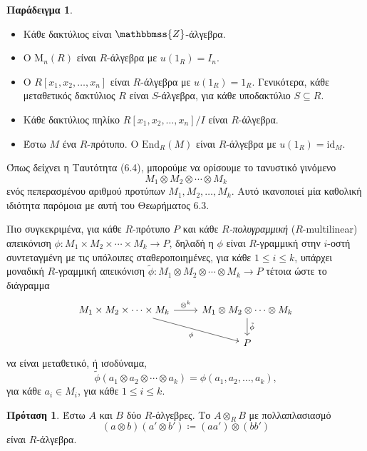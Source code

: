 \documentclass[12pt,a4paper,reqno]{amsart}
\theoremstyle{definition}
\newtheorem{proposition}[theorem]{Πρόταση}
\newtheorem{example}[theorem]{Παράδειγμα}
\theoremstyle{remark}
\numberwithin{theorem}{section}
\numberwithin{exercise}{section}
\numberwithin{equation}{section}
\newcommand{\ZZ}{\mathbbmss{Z}}
\newcommand{\rmM}{\mathrm{M}}
\renewcommand{\to}{\rightarrow}
\newcommand{\End}{\mathrm{End}}
\newcommand{\rmid}{\mathrm{id}}
\begin{document}
\begin{example}
    \label{ex:algebra}
    \leavevmode
    \begin{itemize}
        \item[(α)] Κάθε δακτύλιος είναι $\ZZ$-άλγεβρα.
        \item[(β)] Ο $\rmM_n(R)$ είναι $R$-άλγεβρα με $u(1_R) = I_n$.
        \item[(γ)] Ο $R[x_1, x_2, \dots, x_n]$ είναι $R$-άλγεβρα με $u(1_R) = 1_R$.  Γενικότερα, κάθε μεταθετικός δακτύλιος $R$ είναι $S$-άλγεβρα, για κάθε υποδακτύλιο $S \subseteq R$.  
        \item[(δ)] Κάθε δακτύλιος πηλίκο $R[x_1, x_2, \dots, x_n]/I$ είναι $R$-άλγεβρα.
        \item[(ε)] Έστω $M$ ένα $R$-πρότυπο. Ο $\End_R(M)$ είναι $R$-άλγεβρα με $u(1_R) = \rmid_M$.
    \end{itemize}
\end{example}

Όπως δείχνει η Ταυτότητα (6.4),
μπορούμε να ορίσουμε το τανυστικό γινόμενο 
\[
M_1 \otimes M_2 \otimes \cdots \otimes M_k
\]  
ενός πεπερασμένου αριθμού προτύπων $M_1, M_2, \dots, M_k$. Αυτό ικανοποιεί μία καθολική ιδιό\-τητα παρόμοια με αυτή του Θεωρήματος 6.3.

Πιο συγκεκριμένα, για κάθε $R$-πρότυπο $P$ και κάθε \emph{$R$-πολυγραμμική} ($R$-multilinear) απει\-κόνιση $\phi : M_1 \times M_2 \times \cdots \times M_k \to P$, δηλαδή η $\phi$ είναι $R$-γραμμική στην $i$-οστή συντεταγμένη με τις υπόλοιπες σταθεροποιημένες, για κάθε $1 \le i \le k$, υπάρχει μοναδική $R$-γραμμική απεικόνιση $\tilde{\phi} : M_1 \otimes M_2 \otimes \cdots \otimes M_k \to P$ τέτοια ώστε το διάγραμμα 
\[
    \begin{tikzcd}
    M_1 \times M_2 \times \cdots \times M_k \arrow[r, "\otimes^k"] \arrow[dr, "\phi"'] & M_1 \otimes M_2 \otimes \cdots \otimes M_k \arrow[d, "\tilde{\phi}"] \\
                                        & P
    \end{tikzcd}
\]
να είναι μεταθετικό, ή ισοδύναμα, 
\[
\tilde{\phi}(a_1 \otimes a_2 \otimes \cdots \otimes a_k) = \phi(a_1,a_2,\dots, a_k),
\]
για κάθε $a_i \in M_i$, για κάθε $1 \le i \le k$.

\begin{proposition}
    \label{prop:tensorProduct_algebras}
    Έστω $A$ και $B$ δύο $R$-άλγεβρες. Το $A \otimes_R B$ με πολλαπλασιασμό
    \[
    (a \otimes b) (a' \otimes b') \coloneqq (aa') \otimes (bb')
    \]
    είναι $R$-άλγεβρα.
\end{proposition}
\end{document}
